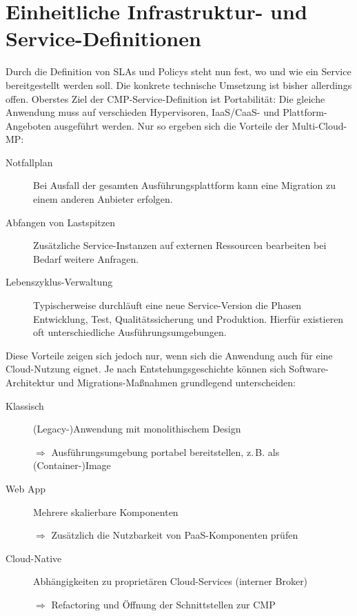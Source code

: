 

\section{Einheitliche Infrastruktur- und Service-Definitionen}

Durch die Definition von SLAs und Policys steht nun fest, wo und wie ein Service bereitgestellt werden soll. Die konkrete technische Umsetzung ist bisher allerdings offen. Oberstes Ziel der CMP-Service-Definition ist Portabilität: Die gleiche Anwendung muss auf verschieden Hypervisoren, IaaS/CaaS- und Plattform-Angeboten ausgeführt werden. Nur so ergeben sich die Vorteile der Multi-Cloud-MP:

\begin{description}
	
	\item[Notfallplan] Bei Ausfall der gesamten Ausführungsplattform kann eine Migration zu einem anderen Anbieter erfolgen.
	
	\item[Abfangen von Lastspitzen] Zusätzliche Service-Instanzen auf externen Ressourcen bearbeiten bei Bedarf weitere Anfragen.
	
	\item[Lebenszyklus-Verwaltung] Typischerweise durchläuft eine neue Service-Version die Phasen Entwicklung, Test, Qualitätssicherung und Produktion. Hierfür existieren oft unterschiedliche Ausführungsumgebungen.
	
\end{description}


\noindent
Diese Vorteile zeigen sich jedoch nur, wenn sich die Anwendung auch für eine Cloud-Nutzung eignet. Je nach Entstehungsgeschichte können sich Software-Architektur und Migrations-Maßnahmen grundlegend unterscheiden:

\begin{description}
	
	\item[Klassisch] (Legacy-)Anwendung mit monolithischem Design
	
	$\Rightarrow$ Ausführungsumgebung portabel bereitstellen, z.\,B. als (Container-)Image
	
	\item[Web App] Mehrere skalierbare Komponenten
	
	$\Rightarrow$ Zusätzlich die Nutzbarkeit von PaaS-Komponenten prüfen
	
	\item[Cloud-Native] Abhängigkeiten zu proprietären Cloud-Services (interner Broker)
	
	$\Rightarrow$ Refactoring und Öffnung der Schnittstellen zur CMP
	
\end{description}

